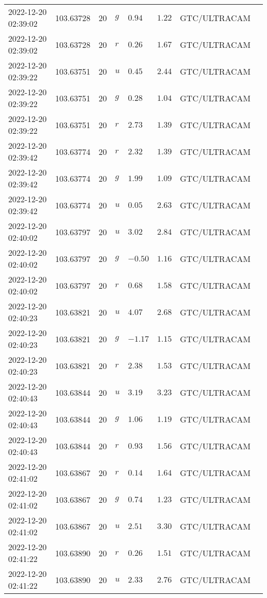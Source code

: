 \documentclass{nature_plusfigure}
\begin{document}
\begin{supplement}
\begin{center}
\begin{longtable}{llllllll}
2022-12-20 02:39:02 & 103.63728 & 20 & $g$ & $0.94$ & $1.22$ & GTC/ULTRACAM &  \\ 
2022-12-20 02:39:02 & 103.63728 & 20 & $r$ & $0.26$ & $1.67$ & GTC/ULTRACAM &  \\ 
2022-12-20 02:39:22 & 103.63751 & 20 & $u$ & $0.45$ & $2.44$ & GTC/ULTRACAM &  \\ 
2022-12-20 02:39:22 & 103.63751 & 20 & $g$ & $0.28$ & $1.04$ & GTC/ULTRACAM &  \\ 
2022-12-20 02:39:22 & 103.63751 & 20 & $r$ & $2.73$ & $1.39$ & GTC/ULTRACAM &  \\ 
2022-12-20 02:39:42 & 103.63774 & 20 & $r$ & $2.32$ & $1.39$ & GTC/ULTRACAM &  \\ 
2022-12-20 02:39:42 & 103.63774 & 20 & $g$ & $1.99$ & $1.09$ & GTC/ULTRACAM &  \\ 
2022-12-20 02:39:42 & 103.63774 & 20 & $u$ & $0.05$ & $2.63$ & GTC/ULTRACAM &  \\ 
2022-12-20 02:40:02 & 103.63797 & 20 & $u$ & $3.02$ & $2.84$ & GTC/ULTRACAM &  \\ 
2022-12-20 02:40:02 & 103.63797 & 20 & $g$ & $-0.50$ & $1.16$ & GTC/ULTRACAM &  \\ 
2022-12-20 02:40:02 & 103.63797 & 20 & $r$ & $0.68$ & $1.58$ & GTC/ULTRACAM &  \\ 
2022-12-20 02:40:23 & 103.63821 & 20 & $u$ & $4.07$ & $2.68$ & GTC/ULTRACAM &  \\ 
2022-12-20 02:40:23 & 103.63821 & 20 & $g$ & $-1.17$ & $1.15$ & GTC/ULTRACAM &  \\ 
2022-12-20 02:40:23 & 103.63821 & 20 & $r$ & $2.38$ & $1.53$ & GTC/ULTRACAM &  \\ 
2022-12-20 02:40:43 & 103.63844 & 20 & $u$ & $3.19$ & $3.23$ & GTC/ULTRACAM &  \\ 
2022-12-20 02:40:43 & 103.63844 & 20 & $g$ & $1.06$ & $1.19$ & GTC/ULTRACAM &  \\ 
2022-12-20 02:40:43 & 103.63844 & 20 & $r$ & $0.93$ & $1.56$ & GTC/ULTRACAM &  \\ 
2022-12-20 02:41:02 & 103.63867 & 20 & $r$ & $0.14$ & $1.64$ & GTC/ULTRACAM &  \\ 
2022-12-20 02:41:02 & 103.63867 & 20 & $g$ & $0.74$ & $1.23$ & GTC/ULTRACAM &  \\ 
2022-12-20 02:41:02 & 103.63867 & 20 & $u$ & $2.51$ & $3.30$ & GTC/ULTRACAM &  \\ 
2022-12-20 02:41:22 & 103.63890 & 20 & $r$ & $0.26$ & $1.51$ & GTC/ULTRACAM &  \\ 
2022-12-20 02:41:22 & 103.63890 & 20 & $u$ & $2.33$ & $2.76$ & GTC/ULTRACAM &  \\ 

\end{longtable}
\end{center}
\end{supplement}
\end{document}
